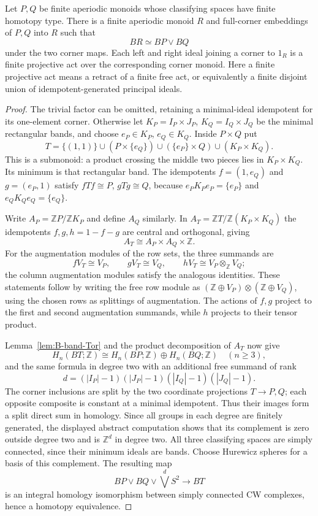 \begin{lemma}
\label{D:corner-wedge}
Let $P,Q$ be finite aperiodic monoids whose classifying spaces have finite
homotopy type. There is a finite aperiodic monoid $R$ and full-corner
embeddings of $P,Q$ into $R$ such that
\[
 BR\simeq BP\vee BQ
\]
under the two corner maps. Each left and right ideal joining a corner to
$1_R$ is a finite projective act over the corresponding corner monoid.
Here a finite projective act means a retract of a finite free act, or
equivalently a finite disjoint union of idempotent-generated principal
ideals.
\end{lemma}
\begin{proof}
The trivial factor can be omitted, retaining a minimal-ideal idempotent
for its one-element corner. Otherwise let
$K_P=I_P\times J_P$, $K_Q=I_Q\times J_Q$ be the minimal rectangular
bands, and choose $e_P\in K_P$, $e_Q\in K_Q$. Inside $P\times Q$ put
\[
 T=\{(1,1)\}\cup(P\times\{e_Q\})\cup(\{e_P\}\times Q)
       \cup(K_P\times K_Q).
\]
This is a submonoid: a product crossing the middle two pieces lies in
$K_P\times K_Q$. Its minimum is that rectangular band. The idempotents
$f=(1,e_Q)$ and $g=(e_P,1)$ satisfy
$fTf\cong P$, $gTg\cong Q$, because
$e_PK_Pe_P=\{e_P\}$ and $e_QK_Qe_Q=\{e_Q\}$.

Write $A_P=\mathbb ZP/\mathbb ZK_P$ and define $A_Q$ similarly. In
$A_T=\mathbb ZT/\mathbb Z(K_P\times K_Q)$ the idempotents
$f,g,h=1-f-g$ are central and orthogonal, giving
\[
 A_T\cong A_P\times A_Q\times\mathbb Z.
\]
For the augmentation modules of the row sets, the three summands are
\[
 fV_T\cong V_P,\qquad gV_T\cong V_Q,\qquad
 hV_T\cong V_P\otimes_{\mathbb Z}V_Q;
\]
the column augmentation modules satisfy the analogous identities.
These statements follow by writing the free row module as
$(\mathbb Z\oplus V_P)\otimes(\mathbb Z\oplus V_Q)$, using the chosen
rows as splittings of augmentation. The actions of $f,g$ project to the
first and second augmentation summands, while $h$ projects to their tensor
product.

Lemma~\ref{lem:B-band-Tor} and the product decomposition of $A_T$ now give
\[
 H_n(BT;\mathbb Z)\cong H_n(BP;\mathbb Z)\oplus H_n(BQ;\mathbb Z)
       \quad(n\ge3),
\]
and the same formula in degree two with an additional free summand of rank
\[
 d=(|I_P|-1)(|J_P|-1)(|I_Q|-1)(|J_Q|-1).
\]
The corner inclusions are split by the two coordinate projections
$T\to P,Q$; each opposite composite is constant at a minimal idempotent.
Thus their images form a split direct sum in homology. Since all groups
in each degree are finitely generated, the displayed abstract computation
shows that its complement is zero outside degree two and is
$\mathbb Z^d$ in degree two. All three classifying spaces are simply
connected, since their minimum ideals are bands. Choose Hurewicz spheres
for a basis of this complement. The resulting map
\[
 BP\vee BQ\vee\bigvee^d S^2\longrightarrow BT
\]
is an integral homology isomorphism between simply connected CW complexes,
hence a homotopy equivalence.


\end{proof}
